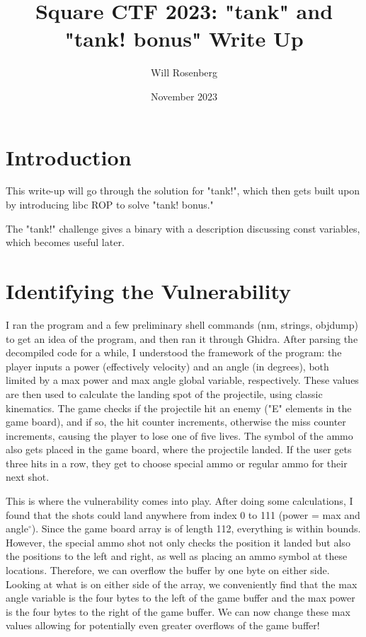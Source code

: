 \documentclass{article}
\title{Square CTF 2023: "tank" and "tank! bonus" Write Up}
\author{Will Rosenberg}
\date{November 2023}
\begin{document}
\maketitle

\section{Introduction}
This write-up will go through the solution for "tank!", which then gets built upon by introducing libc ROP to solve "tank! bonus." \newline

The "tank!" challenge gives a binary with a description discussing const variables, which becomes useful later.

\section{Identifying the Vulnerability}
I ran the program and a few preliminary shell commands (nm, strings, objdump) to get an idea of the program, and then ran it through Ghidra. 
After parsing the decompiled code for a while, I understood the framework of the program: the player inputs a power (effectively velocity) and  an angle (in degrees), 
both limited by a max power and max angle global variable, respectively. These values are then used to calculate the landing spot of the projectile, using classic kinematics. The game checks if the projectile hit an enemy ("E" elements in the game board), and if so, 
the hit counter increments, otherwise the miss counter increments, causing the player to lose one of five lives. The symbol of the ammo also gets placed in the game board, where the projectile landed. 
If the user gets three hits in a row, they get to choose special ammo or regular ammo for their next shot. \newline

This is where the vulnerability comes into play. After doing some calculations, I found that the shots could land anywhere from index 0 to 111 (power = max and angle$^{\circ}$). 
Since the game board array is of length 112, everything is within bounds. However, the special ammo shot not only checks the position it landed but also the positions to the left and right, as well as placing an ammo symbol at these locations. 
Therefore, we can overflow the buffer by one byte on either side. Looking at what is on either side of the array, we conveniently find that the max angle variable is the 
four bytes to the left of the game buffer and the max power is the four bytes to the right of the game buffer. We can now change these max values allowing for potentially even greater overflows of the game buffer!
\end{document}

